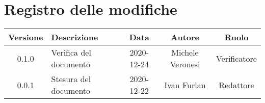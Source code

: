 \section*{Registro delle modifiche}

\begin{center}
	\begin{longtable}{|c|p{5cm}|c|c|c|}
		\hline
		\rowcolor{lighter-grayer}
		\textbf{Versione} & \textbf{Descrizione}             & \textbf{Data} & \textbf{Autore} & \textbf{Ruolo} \\
		\hline
		\endfirsthead


		\hline
		0.1.0 & Verifica del documento & 2020-12-24 & Michele Veronesi & Verificatore \\
		0.0.1 & Stesura del documento & 2020-12-22 & Ivan Furlan & Redattore \\
		\hline
	\end{longtable}
\end{center}